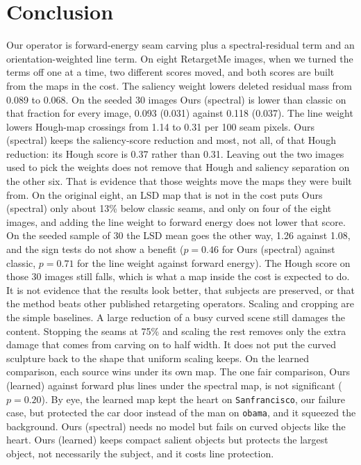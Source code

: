 \documentclass[10pt,twocolumn,letterpaper]{article}
\begin{document}
\section{Conclusion}
Our operator is forward-energy seam carving plus a spectral-residual term and an orientation-weighted line term.
On eight RetargetMe images, when we turned the terms off one at a time, two different scores moved, and both scores are built from the maps in the cost.
The saliency weight lowers deleted residual mass from 0.089 to 0.068.
On the seeded 30 images Ours (spectral) is lower than classic on that fraction for every image, 0.093 (0.031) against 0.118 (0.037).
The line weight lowers Hough-map crossings from 1.14 to 0.31 per 100 seam pixels.
Ours (spectral) keeps the saliency-score reduction and most, not all, of that Hough reduction: its Hough score is 0.37 rather than 0.31.
Leaving out the two images used to pick the weights does not remove that Hough and saliency separation on the other six.
That is evidence that those weights move the maps they were built from.
On the original eight, an LSD map that is not in the cost puts Ours (spectral) only about 13\% below classic seams, and only on four of the eight images, and adding the line weight to forward energy does not lower that score.
On the seeded sample of 30 the LSD mean goes the other way, 1.26 against 1.08, and the sign tests do not show a benefit ($p = 0.46$ for Ours (spectral) against classic, $p = 0.71$ for the line weight against forward energy).
The Hough score on those 30 images still falls, which is what a map inside the cost is expected to do.
It is not evidence that the results look better, that subjects are preserved, or that the method beats other published retargeting operators.
Scaling and cropping are the simple baselines.
A large reduction of a busy curved scene still damages the content.
Stopping the seams at 75\% and scaling the rest removes only the extra damage that comes from carving on to half width.
It does not put the curved sculpture back to the shape that uniform scaling keeps.
On the learned comparison, each source wins under its own map.
The one fair comparison, Ours (learned) against forward plus lines under the spectral map, is not significant ($p = 0.20$).
By eye, the learned map kept the heart on \texttt{Sanfrancisco}, our failure case, but protected the car door instead of the man on \texttt{obama}, and it squeezed the background.
Ours (spectral) needs no model but fails on curved objects like the heart.
Ours (learned) keeps compact salient objects but protects the largest object, not necessarily the subject, and it costs line protection.
\end{document}
